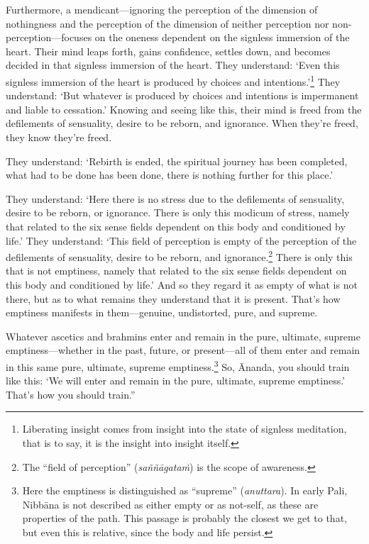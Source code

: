 \documentclass[12pt,openany]{book}%
\begin{document}
Furthermore, a mendicant—ignoring the perception of the dimension of nothingness and the perception of the dimension of neither perception nor non-perception—focuses on the oneness dependent on the signless immersion of the heart. Their mind leaps forth, gains confidence, settles down, and becomes decided in that signless immersion of the heart. They understand: ‘Even this signless immersion of the heart is produced by choices and intentions.’\footnote{Liberating insight comes from insight into the state of signless meditation, that is to say, it is the insight into insight itself. } They understand: ‘But whatever is produced by choices and intentions is impermanent and liable to cessation.’ Knowing and seeing like this, their mind is freed from the defilements of sensuality, desire to be reborn, and ignorance. When they’re freed, they know they’re freed. 

They understand: ‘Rebirth is ended, the spiritual journey has been completed, what had to be done has been done, there is nothing further for this place.’ 

They understand: ‘Here there is no stress due to the defilements of sensuality, desire to be reborn, or ignorance. There is only this modicum of stress, namely that related to the six sense fields dependent on this body and conditioned by life.’ They understand: ‘This field of perception is empty of the perception of the defilements of sensuality, desire to be reborn, and ignorance.\footnote{The “field of perception” (\textit{\textsanskrit{saññāgataṁ}}) is the scope of awareness. } There is only this that is not emptiness, namely that related to the six sense fields dependent on this body and conditioned by life.’ And so they regard it as empty of what is not there, but as to what remains they understand that it is present. That’s how emptiness manifests in them—genuine, undistorted, pure, and supreme. 

Whatever ascetics and brahmins enter and remain in the pure, ultimate, supreme emptiness—whether in the past, future, or present—all of them enter and remain in this same pure, ultimate, supreme emptiness.\footnote{Here the emptiness is distinguished as “supreme” (\textit{anuttara}). In early Pali, \textsanskrit{Nibbāna} is not described as either empty or as not-self, as these are properties of the path. This passage is probably the closest we get to that, but even this is relative, since the body and life persist. } So, Ānanda, you should train like this: ‘We will enter and remain in the pure, ultimate, supreme emptiness.’ That’s how you should train.” 
\end{document}
